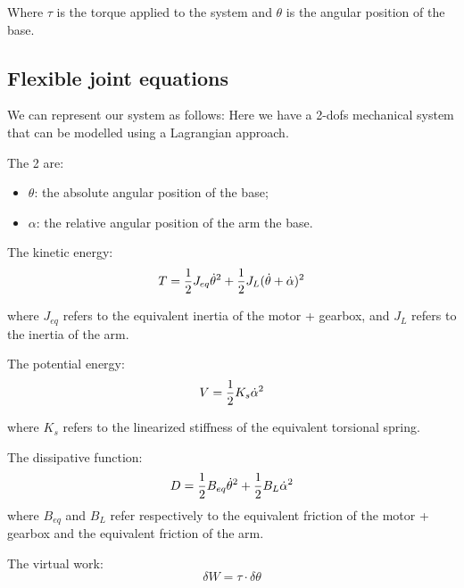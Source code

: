             Where $\tau$ is the torque applied to the system and $\theta$ is the angular position of the base.

        \subsection{Flexible joint equations}

            We can represent our system as follows:
            Here we have a 2-dofs mechanical system that can be modelled using a Lagrangian approach.

            \bigbreak

            The 2 \dofs are:
            \begin{itemize}
                \item $\theta$: the absolute angular position of the base;
                \item $\alpha$: the relative angular position of the arm \wrt the base.
            \end{itemize}

            \bigbreak

            The kinetic energy:
            \[
                T = \frac{1}{2} J_{eq} \dot{\theta} ^2 + \frac{1}{2} J_{L} (\dot{\theta} + \dot{\alpha}) ^2 
            \]

            where $J_{eq}$ refers to the equivalent inertia of the motor + gearbox, and $J_{L}$ refers to the inertia of the arm.

            \bigbreak 

            The potential energy:
            \[
                V = \frac{1}{2} K_s \dot{\alpha}^2
            \]

            where $K_s$ refers to the linearized stiffness of the equivalent torsional spring.
            
            \bigbreak

            The dissipative function:
            \[
                D = \frac{1}{2} B_{eq} \dot{\theta}^2 + \frac{1}{2} B_{L} \dot{\alpha}^2\]
            where $B_{eq}$ and $B_L$ refer respectively to the equivalent friction of the motor + gearbox and the equivalent friction of the arm.

            The virtual work:
            \[
                \delta W = \tau \cdot \delta \theta
            \]
            

